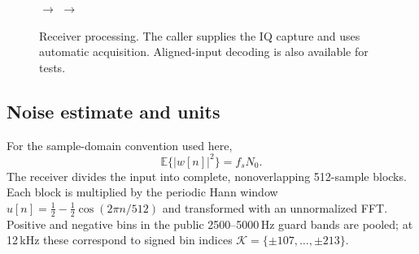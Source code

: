 \documentclass[11pt,a4paper]{article}
\newcommand{\E}{\mathbb{E}}
\begin{document}
\begin{figure}[ht]
\centering
\small
{}
$\longrightarrow$
$\longrightarrow$
\caption{Receiver processing. The caller supplies the IQ capture and
uses automatic acquisition. Aligned-input decoding is also available for tests.}
\label{fig:receiver}
\end{figure}

\subsection{Noise estimate and units}

For the sample-domain convention used here,
\begin{equation}
  \E\{|w[n]|^2\}=f_sN_0.
  \label{eq:noiseunits}
\end{equation}
The receiver divides the input into complete, nonoverlapping 512-sample
blocks. Each block is multiplied by the periodic Hann window
$u[n]=\tfrac12-\tfrac12\cos(2\pi n/512)$ and transformed with an unnormalized
FFT. Positive and negative bins in the public 2500--5000\,Hz guard bands
are pooled; at 12\,kHz these correspond to signed bin indices
$\mathcal K=\{\pm107,\ldots,\pm213\}$.
\end{document}
